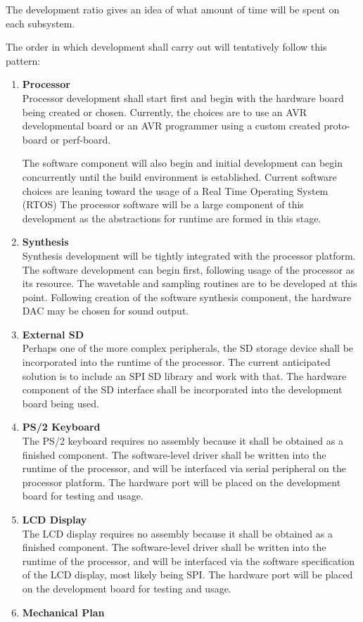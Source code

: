 \documentclass[bibtotocnumbered,abstract=on,paper=a4,fontsize=12pt,parskip=on,halfparskip=on]{scrartcl}		%
\begin{document}
    The development ratio gives an idea of what amount of time will be spent on each subsystem. 

    The order in which development shall carry out will tentatively follow this pattern:
    \begin{enumerate}
      \item{\textbf{Processor}}\hfill \\
      Processor development shall start first and begin with the hardware board being created or chosen. Currently, the choices are to use an AVR developmental board or an AVR programmer using a custom created proto-board or perf-board. 

      The software component will also begin and initial development can begin concurrently until the build environment is established. Current software choices are leaning toward the usage of a Real Time Operating System (RTOS) The processor software will be a large component of this development as the abstractions for runtime are formed in this stage.
      \item{\textbf{Synthesis}}\hfill \\
      Synthesis development will be tightly integrated with the processor platform. The software development can begin first, following usage of the processor as its resource. The wavetable and sampling routines are to be developed at this point. Following creation of the software synthesis component, the hardware DAC may be chosen for sound output.
      \item{\textbf{External SD}}\hfill \\
      Perhaps one of the more complex peripherals, the SD storage device shall be incorporated into the runtime of the processor. The current anticipated solution is to include an SPI\cite{FFoust2004} SD library and work with that. The hardware component of the SD interface shall be incorporated into the development board being used.
      \item{\textbf{PS/2 Keyboard}}\hfill \\
      The PS/2 keyboard requires no assembly because it shall be obtained as a finished component. The software-level driver shall be written into the runtime of the processor, and will be interfaced via serial peripheral on the processor platform\cite{website:avinash}. The hardware port will be placed on the development board for testing and usage.
      \item{\textbf{LCD Display}}\hfill \\
      The LCD display requires no assembly because it shall be obtained as a finished component. The software-level driver shall be written into the runtime of the processor, and will be interfaced via the software specification of the LCD display, most likely being SPI. The hardware port will be placed on the development board for testing and usage.
      \item{\textbf{Mechanical Plan}}\hfill \\


\end{enumerate}
\end{document}
